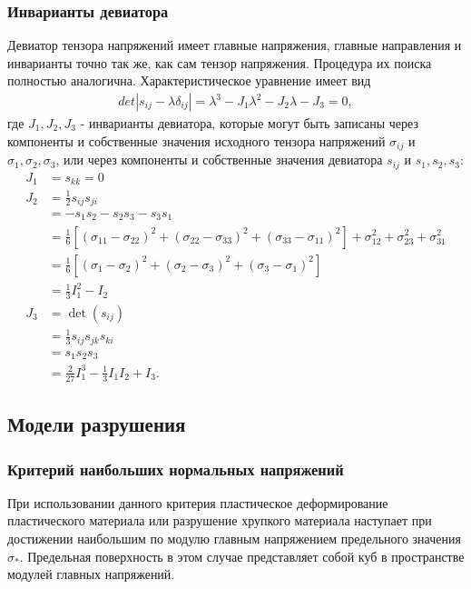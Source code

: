 \subsubsection{Инварианты девиатора}

Девиатор тензора напряжений имеет главные напряжения, главные направления и инварианты точно так же, как сам тензор напряжения. Процедура их поиска полностью аналогична. Характеристическое уравнение имеет вид
\begin{eqnarray}
det|s_{ij}- \lambda\delta_{ij}| = \lambda^3-J_1\lambda^2-J_2\lambda-J_3=0,
\end{eqnarray}
где $J_1, J_2, J_3$ - инварианты девиатора, которые могут быть записаны через компоненты и собственные значения исходного тензора напряжений $\sigma_{ij}$ и $\sigma_1, \sigma_2, \sigma_3$, или через компоненты и собственные значения девиатора $s_{ij}$ и $s_1, s_2, s_3$:
\begin{eqnarray}
J_1 &= s_{kk}=0 \\ 
J_2 &= \frac{1}{2}s_{ij}s_{ji} \\ &= -s_1s_2 - s_2s_3 - s_3s_1 \\ 
&= \tfrac{1}{6}\left[(\sigma_{11} - \sigma_{22})^2 + (\sigma_{22} - \sigma_{33})^2 + (\sigma_{33} - \sigma_{11})^2 \right ] + \sigma_{12}^2 + \sigma_{23}^2 + \sigma_{31}^2 \\ 
&= \tfrac{1}{6}\left[(\sigma_1 - \sigma_2)^2 + (\sigma_2 - \sigma_3)^2 + (\sigma_3 - \sigma_1)^2 \right ] \\ &= \tfrac{1}{3}I_1^2-I_2 \\ 
J_3 &= \det(s_{ij}) \\ 
&= \tfrac{1}{3}s_{ij}s_{jk}s_{ki} \\ 
&= s_1s_2s_3 \\ 
&= \tfrac{2}{27}I_1^3 - \tfrac{1}{3}I_1 I_2 + I_3.
\end{eqnarray}

\clearpage
\newpage


\subsection{Модели разрушения}
\label{sec:destruction_models}

\subsubsection{Критерий наибольших нормальных напряжений}

При использовании данного критерия пластическое деформирование пластического материала или разрушение хрупкого материала наступает при достижении наибольшим по модулю главным напряжением предельного значения $\sigma_*$. Предельная поверхность в этом случае представляет собой куб в пространстве модулей главных напряжений.


